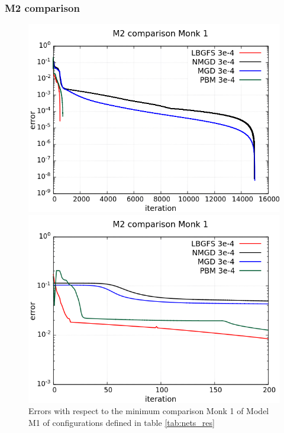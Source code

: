 \subsubsection{M2 comparison}

\begin{figure}[H]
	\centering
	\begin{minipage}[t]{0.5\linewidth}
		\includegraphics[width=\linewidth]{data/Comparison/Monk1/Monk1_M2_error_standard.png}
	\end{minipage}%
	\begin{minipage}[t]{0.5\linewidth}
		\includegraphics[width=\linewidth]{data/Comparison/Monk1/Monk1_M2_error_zoom.png}
	\end{minipage}
	\caption{Errors with respect to the minimum comparison Monk 1 of Model M1 of configurations defined in table \ref{tab:nets_res}}
	\label{R-Monk1-M2}
\end{figure}

